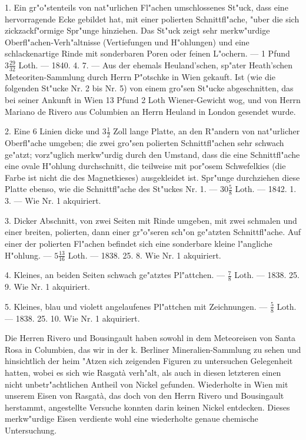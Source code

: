 \documentclass[a4paper, 11pt, oneside, polutonikogreek, german]{article}
\begin{document}
1. Ein gr"o"stenteils von nat"urlichen Fl"achen umschlossenes St"uck, dass eine hervorragende Ecke gebildet hat, mit einer polierten Schnittfl"ache, "uber die sich zickzackf"ormige Spr"unge hinziehen. Das St"uck zeigt sehr merkw"urdige Oberfl"achen-Verh"altnisse (Vertiefungen und H"ohlungen) und eine schlackenartige Rinde mit sonderbaren Poren oder feinen L"ochern. --- 1 Pfund $\mathfrak{3\frac{29}{32}}$ Loth. --- 1840. 4. 7. --- Aus der ehemals Heuland'schen, sp"ater Heath'schen Meteoriten-Sammlung durch Herrn P"otschke in Wien gekauft. Ist (wie die folgenden St"ucke Nr. 2 bis Nr. 5) von einem gro"sen St"ucke abgeschnitten, das bei seiner Ankunft in Wien 13 Pfund 2 Loth Wiener-Gewicht wog, und von Herrn Mariano de Rivero aus Columbien an Herrn Heuland in London gesendet wurde.

2. Eine 6 Linien dicke und $\mathfrak{3\frac{1}{2}}$ Zoll lange Platte, an den R"andern von nat"urlicher Oberfl"ache umgeben; die zwei gro"sen polierten Schnittfl"achen sehr schwach ge"atzt; vorz"uglich merkw"urdig durch den Umstand, dass die eine Schnittfl"ache eine ovale H"ohlung durchschnitt, die teilweise mit por"osem Schwefelkies (die Farbe ist nicht die des Magnetkieses) ausgekleidet ist. Spr"unge durchziehen diese Platte ebenso, wie die Schnittfl"ache des St"uckes Nr. 1. --- $\mathfrak{30\frac{5}{8}}$ Loth. --- 1842. 1. 3. --- Wie Nr. 1 akquiriert.

3. Dicker Abschnitt, von zwei Seiten mit Rinde umgeben, mit zwei schmalen und einer breiten, polierten, dann einer gr"o"seren sch"on ge"atzten Schnittfl"ache. Auf einer der polierten Fl"achen befindet sich eine sonderbare kleine l"angliche H"ohlung. --- $\mathfrak{5\frac{13}{16}}$ Loth. --- 1838. 25. 8. Wie Nr. 1 akquiriert.

4. Kleines, an beiden Seiten schwach ge"atztes Pl"attchen. --- $\mathfrak{\frac{7}{8}}$ Loth. --- 1838. 25. 9. Wie Nr. 1 akquiriert.

5. Kleines, blau und violett angelaufenes Pl"attchen mit Zeichnungen. --- $\mathfrak{\frac{5}{8}}$ Loth. --- 1838. 25. 10. Wie Nr. 1 akquiriert.

\setlength{\leftskip}{10mm}
\setlength{\parindent}{0pt}

{\footnotesize Die Herren Rivero und Bousingault haben sowohl in dem Meteoreisen von Santa Rosa in Columbien, das wir in der k. Berliner Mineralien-Sammlung zu sehen und hinsichtlich der heim "Atzen sich zeigenden Figuren zu untersuchen Gelegenheit hatten, wobei es sich wie Rasgatà verh"alt, als auch in diesen letzteren einen nicht unbetr"achtlichen Antheil von Nickel gefunden. Wiederholte in Wien mit unserem Eisen von Rasgatà, das doch von den Herrn Rivero und Bousingault herstammt, angestellte Versuche konnten darin keinen Nickel entdecken. Dieses merkw"urdige Eisen verdiente wohl eine wiederholte genaue chemische Untersuchung.}
\end{document}
